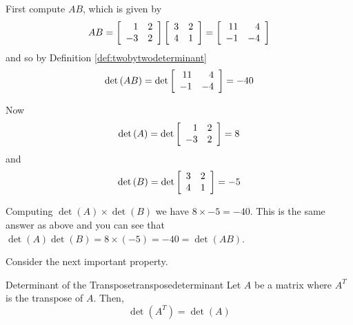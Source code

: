 \begin{solution} First compute $AB$, which is given by 
\begin{equation*}
AB=\left[
\begin{array}{rr}
1 & 2 \\
-3 & 2
\end{array}
\right] \left[
\begin{array}{rr}
3 & 2 \\
4 & 1
\end{array}
\right] = \left[
\begin{array}{rr}
11 & 4 \\
-1 & -4
\end{array}
\right]
\end{equation*}
and so by Definition \ref{def:twobytwodeterminant}
\begin{equation*}
\det \left( AB\right) =\det \left[
\begin{array}{rr}
11 & 4 \\
-1 & -4
\end{array}
\right] = -40
\end{equation*}

Now
\begin{equation*}
\det \left( A\right) =\det \left[
\begin{array}{rr}
1 & 2 \\
-3 & 2
\end{array}
\right] = 8
\end{equation*}
and
\begin{equation*}
\det \left( B\right) =\det \left[
\begin{array}{rr}
3 & 2 \\
4 & 1
\end{array}
\right] = -5
\end{equation*}

Computing $\det \left(A\right) \times \det \left(B\right)$ we 
have $8 \times -5 = -40$. This is the same answer as above and 
you can see that $\det \left( A\right) \det \left( B\right) =8\times \left( -5\right)
=-40 = \det \left(AB\right)$. 
\end{solution}

Consider the next important property. 

\begin{theorem}{Determinant of the Transpose}{transposedeterminant}
Let $A$ be a matrix where $A^T$ is the transpose of $A$. Then,
\begin{equation*}
\det\left(A^T\right) = \det \left( A \right)
\end{equation*}
\end{theorem}

